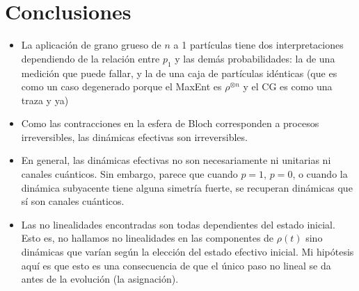 \chapter{Conclusiones}
\begin{itemize}
    \item La aplicación de grano grueso de $n$ a 1 partículas tiene dos interpretaciones dependiendo de la relación entre $p_{1}$ y las demás probabilidades: la de una medición que puede fallar, y la de una caja de partículas idénticas (que es como un caso degenerado porque el MaxEnt es $\rho^{\otimes n}$ y el CG es como una traza y ya)
    \item Como las contracciones en la esfera de Bloch corresponden a procesos irreversibles, las dinámicas efectivas son irreversibles.
    \item En general, las dinámicas efectivas no son necesariamente ni unitarias ni canales cuánticos. Sin embargo, parece que cuando $p=1$, $p=0$, o cuando la dinámica subyacente tiene alguna simetría fuerte, se recuperan dinámicas que sí son canales cuánticos.
    \item Las no linealidades encontradas son todas dependientes del estado inicial. Esto es, no hallamos no linealidades en las componentes de $\rho(t)$ sino dinámicas que varían según la elección del estado efectivo inicial. Mi hipótesis aquí es que esto es una consecuencia de que el único paso no lineal se da antes de la evolución (la asignación).
\end{itemize}